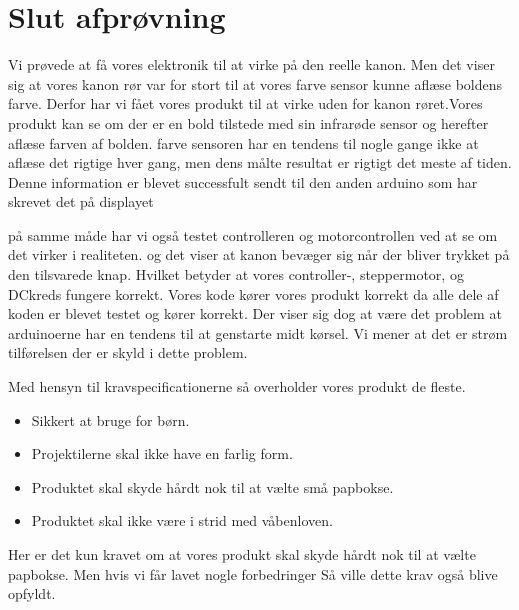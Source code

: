 \section{Slut afprøvning} \label{sluttest}
Vi prøvede at få vores elektronik til at virke på den reelle kanon. Men det viser sig at vores kanon rør var for stort til at vores farve sensor kunne aflæse boldens farve.
Derfor har vi fået vores produkt til at virke uden for kanon røret.Vores produkt kan se om der er en bold tilstede med sin infrarøde sensor og herefter aflæse farven af bolden. farve sensoren har en tendens til nogle gange ikke at aflæse det rigtige hver gang, men dens målte resultat er rigtigt det meste af tiden.
Denne information er blevet successfult sendt til den anden arduino som har skrevet det på displayet


på samme måde har vi også testet controlleren og motorcontrollen ved at se om det virker i realiteten. og det viser at kanon bevæger sig når der bliver trykket på den tilsvarede knap. Hvilket betyder at vores controller-, steppermotor, og DCkreds fungere korrekt.
Vores kode kører vores produkt korrekt da alle dele af koden er blevet testet og kører korrekt. Der viser sig dog at være det problem at arduinoerne har en tendens til at genstarte midt kørsel. Vi mener at det er strøm tilførelsen der er skyld i dette problem.

Med hensyn til kravspecificationerne så overholder vores produkt de fleste.

\begin{itemize}
\item Sikkert at bruge for børn.
\item Projektilerne skal ikke have en farlig form.
\item Produktet skal skyde hårdt nok til at vælte små papbokse.
\item Produktet skal ikke være i strid med våbenloven.
\end{itemize}
 
Her er det kun kravet om at vores produkt skal skyde hårdt nok til at vælte papbokse. Men hvis vi får lavet nogle forbedringer Så ville dette krav også blive opfyldt. 





